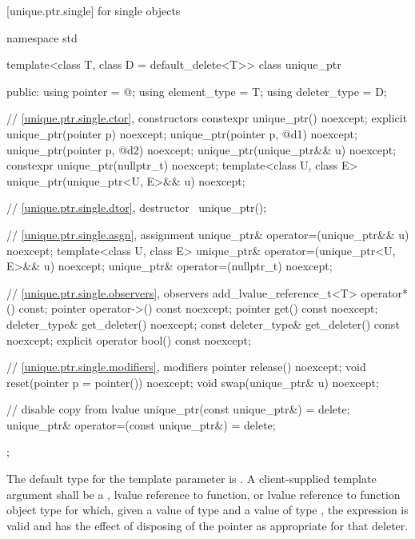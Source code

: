[unique.ptr.single]{ for single objects}

%
\begin{codeblock}
namespace std {
  template<class T, class D = default_delete<T>> class unique_ptr {
  public:
    using pointer      = @\seebelow@;
    using element_type = T;
    using deleter_type = D;

    // \ref{unique.ptr.single.ctor}, constructors
    constexpr unique_ptr() noexcept;
    explicit unique_ptr(pointer p) noexcept;
    unique_ptr(pointer p, @\seebelow@ d1) noexcept;
    unique_ptr(pointer p, @\seebelow@ d2) noexcept;
    unique_ptr(unique_ptr&& u) noexcept;
    constexpr unique_ptr(nullptr_t) noexcept;
    template<class U, class E>
      unique_ptr(unique_ptr<U, E>&& u) noexcept;

    // \ref{unique.ptr.single.dtor}, destructor
    ~unique_ptr();

    // \ref{unique.ptr.single.asgn}, assignment
    unique_ptr& operator=(unique_ptr&& u) noexcept;
    template<class U, class E>
      unique_ptr& operator=(unique_ptr<U, E>&& u) noexcept;
    unique_ptr& operator=(nullptr_t) noexcept;

    // \ref{unique.ptr.single.observers}, observers
    add_lvalue_reference_t<T> operator*() const;
    pointer operator->() const noexcept;
    pointer get() const noexcept;
    deleter_type& get_deleter() noexcept;
    const deleter_type& get_deleter() const noexcept;
    explicit operator bool() const noexcept;

    // \ref{unique.ptr.single.modifiers}, modifiers
    pointer release() noexcept;
    void reset(pointer p = pointer()) noexcept;
    void swap(unique_ptr& u) noexcept;

    // disable copy from lvalue
    unique_ptr(const unique_ptr&) = delete;
    unique_ptr& operator=(const unique_ptr&) = delete;
  };
}
\end{codeblock}

\pnum
The default type for the template parameter  is
. A client-supplied template argument
 shall be a
,
lvalue reference to function, or
lvalue reference to function object type
for which, given
a value  of type  and a value
 of type , the expression
 is valid and has the effect of disposing of the
pointer as appropriate for that deleter.

